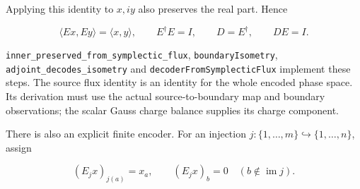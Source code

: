 \documentclass[
]{article}
\begin{document}
Applying this identity to \(x,iy\) also preserves the real part. Hence

\[
\langle Ex,Ey\rangle=\langle x,y\rangle,\qquad
E^\dagger E=I,\qquad D=E^\dagger,\qquad DE=I.
\]

\texttt{i\allowbreak{}n\allowbreak{}n\allowbreak{}e\allowbreak{}r\allowbreak{}\_\allowbreak{}p\allowbreak{}r\allowbreak{}e\allowbreak{}s\allowbreak{}e\allowbreak{}r\allowbreak{}v\allowbreak{}e\allowbreak{}d\allowbreak{}\_\allowbreak{}f\allowbreak{}r\allowbreak{}o\allowbreak{}m\allowbreak{}\_\allowbreak{}s\allowbreak{}y\allowbreak{}m\allowbreak{}p\allowbreak{}l\allowbreak{}e\allowbreak{}c\allowbreak{}t\allowbreak{}i\allowbreak{}c\allowbreak{}\_\allowbreak{}f\allowbreak{}l\allowbreak{}u\allowbreak{}x},
\texttt{boundaryIsometry},
\texttt{a\allowbreak{}d\allowbreak{}j\allowbreak{}o\allowbreak{}i\allowbreak{}n\allowbreak{}t\allowbreak{}\_\allowbreak{}d\allowbreak{}e\allowbreak{}c\allowbreak{}o\allowbreak{}d\allowbreak{}e\allowbreak{}s\allowbreak{}\_\allowbreak{}i\allowbreak{}s\allowbreak{}o\allowbreak{}m\allowbreak{}e\allowbreak{}t\allowbreak{}r\allowbreak{}y}
and
\texttt{d\allowbreak{}e\allowbreak{}c\allowbreak{}o\allowbreak{}d\allowbreak{}e\allowbreak{}r\allowbreak{}F\allowbreak{}r\allowbreak{}o\allowbreak{}m\allowbreak{}S\allowbreak{}y\allowbreak{}m\allowbreak{}p\allowbreak{}l\allowbreak{}e\allowbreak{}c\allowbreak{}t\allowbreak{}i\allowbreak{}c\allowbreak{}F\allowbreak{}l\allowbreak{}u\allowbreak{}x}
implement these steps. The source flux identity is an identity for the
whole encoded phase space. Its derivation must use the actual
source-to-boundary map and boundary observations; the scalar Gauss
charge balance supplies its charge component.

There is also an explicit finite encoder. For an injection
\(j:\{1,\ldots,m\}\hookrightarrow\{1,\ldots,n\}\), assign

\[
(E_jx)_{j(a)}=x_a,\qquad (E_jx)_b=0\quad(b\notin\operatorname{im}j).
\]
\end{document}
